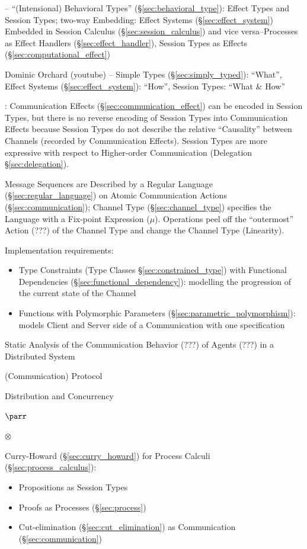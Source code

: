 \cite{orchard-yoshida16} -- ``(Intensional) Behavioral Types''
(\S\ref{sec:behavioral_type}): Effect Types and Session Types; two-way
Embedding: Effect Systems (\S\ref{sec:effect_system}) Embedded in
Session Calculus (\S\ref{sec:session_calculus}) and vice
versa--Processes as Effect Handlers (\S\ref{sec:effect_handler}),
Session Types as Effects (\S\ref{sec:computational_effect})

Dominic Orchard (youtube) -- Simple Types (\S\ref{sec:simply_typed}):
``What'', Effect Systems (\S\ref{sec:effect_system}): ``How'', Session
Types: ``What \& How''

\cite{orchard-yoshida16}: Communication Effects
(\S\ref{sec:communication_effect}) can be encoded in Session Types,
but there is no reverse encoding of Session Types into Communication
Effects because Session Types do not describe the relative
``Causality'' between Channels (recorded by Communication Effects).
Session Types are more expressive with respect to Higher-order
Communication (Delegation \S\ref{sec:delegation}).

Message Sequences are Described by a Regular Language
(\S\ref{sec:regular_language}) on Atomic Communication Actions
(\S\ref{sec:communication}); Channel Type (\S\ref{sec:channel_type})
specifies the Language with a Fix-point Expression ($\mu$). Operations
peel off the ``outermost'' Action (???) of the Channel Type and change
the Channel Type (Linearity). \cite{neubauer-thiemann04}

Implementation requirements: \cite{neubauer-thiemann04}
\begin{itemize}
  \item Type Constraints (Type Classes \S\ref{sec:constrained_type})
    with Functional Dependencies (\S\ref{sec:functional_dependency}):
    modelling the progression of the current state of the Channel
  \item Functions with Polymorphic Parameters
    (\S\ref{sec:parametric_polymorphism}): models Client and Server
    side of a Communication with one specification
\end{itemize}

Static Analysis of the Communication Behavior (???) of Agents (???) in
a Distributed System \cite{gay-vasconcelos10}

(Communication) Protocol

Distribution and Concurrency

$\parr$

$\otimes$

Curry-Howard (\S\ref{sec:curry_howard}) for Process Calculi
(\S\ref{sec:process_calculus}):
\begin{itemize}
  \item Propositions as Session Types
  \item Proofs as Processes (\S\ref{sec:process})
  \item Cut-elimination (\S\ref{sec:cut_elimination}) as Communication
    (\S\ref{sec:communication})
\end{itemize}

